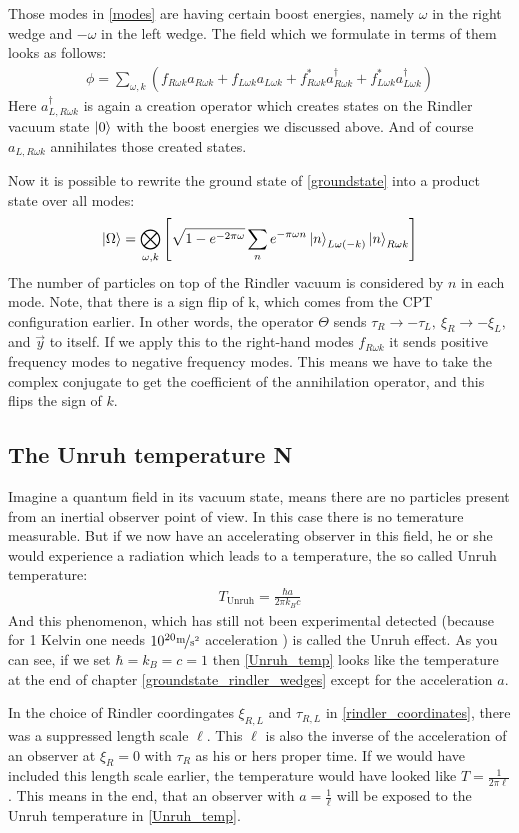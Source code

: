 	Those modes in \eqref{modes} are having certain boost energies, namely $\omega$ in the right wedge and $-\omega$ in the left wedge. The field which we formulate in terms of them looks as follows:
	\begin{align}
		\phi = \sum_{\omega, k} 
		\left(
			f_{R\omega k} a_{R\omega k} + f_{L\omega k}a_{L\omega k} + f^*_{R\omega k} a^\dagger_{R\omega k} + f^*_{L\omega k} a^\dagger_{L\omega k}
		\right)
	\end{align}
	Here $a^\dagger_{L,R\omega k}$ is again a creation operator which creates states on the Rindler vacuum state $\ket{0}$ with the boost energies we discussed above. And of course $a_{L,R\omega k}$ annihilates those created states. 
	
	Now it is possible to rewrite the ground state of \eqref{groundstate} into a product state over all modes:
	\begin{align}
		\ket{\Omega} = \bigotimes_{\omega, k} 
		\left[
			\sqrt{1-e^{-2\pi \omega}} \sum_n e^{-\pi \omega n} \ket{n}_{L \omega (-k)} \ket{n}_{R \omega k}
		\right]
	\end{align}
	The number of particles on top of the Rindler vacuum is considered by $n$ in each mode. Note, that there is a sign flip of k, which comes from the CPT configuration earlier. In other words, the operator $\Theta$ sends $\tau_R \rightarrow -\tau_L,~ \xi_R \rightarrow -\xi_L,$ and $\vec{y}$ to itself. If we apply this to the right-hand modes $f_{R\omega k}$ it sends positive frequency modes to negative frequency modes. This means we have to take the complex conjugate to get the coefficient of the annihilation operator, and this flips the sign of $k$.
\subsection{The Unruh temperature N} \label{Unruh}
Imagine a quantum field in its vacuum state, means there are no particles present from an inertial observer point of view. In this case there is no temerature measurable. But if we now have an accelerating observer in this field, he or she would experience a radiation which leads to a temperature, the so called Unruh temperature:
	\begin{align} \label{Unruh_temp}
		T_{\text{Unruh}}=\frac{\hbar a}{2\pi k_B c}
	\end{align}
And this phenomenon, which has still not been experimental detected (because for 1 Kelvin one needs $10^{20} \unitfrac{m}{s^2}$ acceleration \cite{scholar_Unruh}) is called the Unruh effect. As you can see, if we set $\hbar = k_B = c = 1$ then \eqref{Unruh_temp} looks like the temperature at the end of chapter \ref{groundstate_rindler_wedges} except for the acceleration $a$. 

In the choice of Rindler coordingates $\xi_{R,L}$ and $\tau_{R,L}$ in \eqref{rindler_coordinates}, there was a suppressed length scale $\ell$. This $\ell$ is also the inverse of the acceleration of an observer at $\xi_{R}=0$ with $\tau_R$ as his or hers proper time. If we would have included this length scale earlier, the temperature would have looked like $T=\frac{1}{2\pi \ell}$. This means in the end, that an observer with $a=\frac{1}{\ell}$ will be exposed to the Unruh temperature in \eqref{Unruh_temp}.